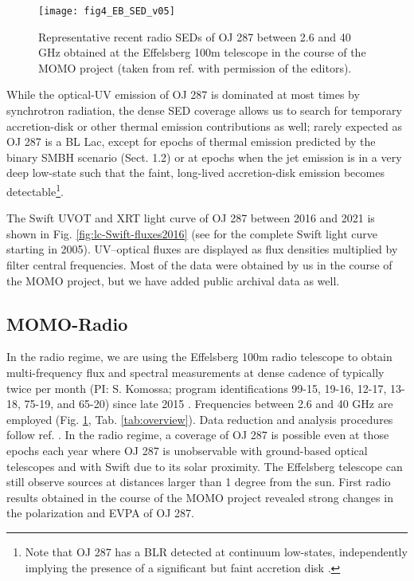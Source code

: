 \documentclass[preprints,article,accept,moreauthors,pdftex]{Definitions/mdpi}
\begin{document}
\begin{figure}
\begin{center}
\texttt{[image: fig4\_EB\_SED\_v05]}
	\caption{Representative recent radio SEDs of OJ 287 between 2.6 and 40 GHz obtained at the Effelsberg 100m telescope in the course of the MOMO project (taken from ref. \citep{Komossa2021b} with permission of the editors). 
     }
     \label{fig:EB_radio_spectra}
\end{center}
\end{figure}

While the optical-UV emission of OJ 287 is dominated at most times by synchrotron radiation, the dense SED coverage allows us to search for temporary accretion-disk or other thermal emission contributions as well; rarely expected as OJ 287 is a BL Lac, except for epochs of thermal emission predicted by the binary SMBH scenario (Sect. 1.2) or at epochs when the jet emission is in a very deep low-state such that the faint, long-lived accretion-disk emission becomes detectable{\footnote{Note that OJ 287 has a BLR detected at continuum low-states, independently implying the presence of a significant but faint accretion disk \citep{SitkoJunkkarinen1985, Nilsson2010}.}}. 

The Swift UVOT and XRT light curve of OJ 287 between 2016 and 2021 is shown in Fig. \ref{fig:lc-Swift-fluxes2016} (see \citep{Komossa2021a, Komossa2021c} for the complete Swift light curve starting in 2005). UV--optical fluxes are displayed as flux densities multiplied by filter central frequencies. Most of the data were obtained by us in the course of the MOMO project, but we have added public archival data as well. 

\subsection{MOMO-Radio}
In the radio regime, we are using the Effelsberg 100m radio telescope to obtain multi-frequency flux and spectral measurements at dense cadence of typically twice per month (PI: S. Komossa; program identifications 99-15, 19-16, 12-17, 13-18, 75-19, and 65-20) since late 2015 \citep{Komossa2015}. Frequencies between 2.6 and 40 GHz are employed (Fig. \ref{fig:EB_radio_spectra}, Tab. \ref{tab:overview}). Data reduction and analysis procedures follow ref. \citep{Kraus2003, Myserlis2018}. 
In the radio regime, a coverage of OJ 287 is possible even at those epochs each year where OJ 287 is unobservable with ground-based optical telescopes and with Swift due to its solar proximity. The Effelsberg telescope can still observe sources at distances larger than 1 degree from the sun. First radio results \citep{Komossa2015, Myserlis2018} obtained in the course of the MOMO project revealed strong changes in the polarization and EVPA of OJ 287.  
\end{document}
